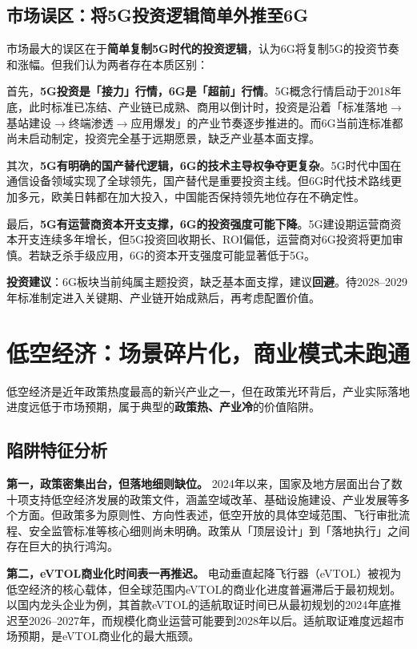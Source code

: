 \subsection{市场误区：将5G投资逻辑简单外推至6G}

市场最大的误区在于\textbf{简单复制5G时代的投资逻辑}，认为6G将复制5G的投资节奏和涨幅。但我们认为两者存在本质区别：

首先，\textbf{5G投资是「接力」行情，6G是「超前」行情}。5G概念行情启动于2018年底，此时标准已冻结、产业链已成熟、商用以倒计时，投资是沿着「标准落地$\to$基站建设$\to$终端渗透$\to$应用爆发」的产业节奏逐步推进的。而6G当前连标准都尚未启动制定，投资完全基于远期愿景，缺乏产业基本面支撑。

其次，\textbf{5G有明确的国产替代逻辑，6G的技术主导权争夺更复杂}。5G时代中国在通信设备领域实现了全球领先，国产替代是重要投资主线。但6G时代技术路线更加多元，欧美日韩都在加大投入，中国能否保持领先地位存在不确定性。

最后，\textbf{5G有运营商资本开支支撑，6G的投资强度可能下降}。5G建设期运营商资本开支连续多年增长，但5G投资回收期长、ROI偏低，运营商对6G投资将更加审慎。若缺乏杀手级应用，6G的资本开支强度可能显著低于5G。

\textbf{投资建议}：6G板块当前纯属主题投资，缺乏基本面支撑，建议\textbf{回避}。待2028--2029年标准制定进入关键期、产业链开始成熟后，再考虑配置价值。

\section{低空经济：场景碎片化，商业模式未跑通}

低空经济是近年政策热度最高的新兴产业之一，但在政策光环背后，产业实际落地进度远低于市场预期，属于典型的\textbf{政策热、产业冷}的价值陷阱。

\subsection{陷阱特征分析}

\textbf{第一，政策密集出台，但落地细则缺位。} 2024年以来，国家及地方层面出台了数十项支持低空经济发展的政策文件，涵盖空域改革、基础设施建设、产业发展等多个方面。但政策多为原则性、方向性表述，低空开放的具体空域范围、飞行审批流程、安全监管标准等核心细则尚未明确。政策从「顶层设计」到「落地执行」之间存在巨大的执行鸿沟。

\textbf{第二，eVTOL商业化时间表一再推迟。} 电动垂直起降飞行器（eVTOL）被视为低空经济的核心载体，但全球范围内eVTOL的商业化进度普遍滞后于最初规划。以国内龙头企业为例，其首款eVTOL的适航取证时间已从最初规划的2024年底推迟至2026--2027年，而规模化商业运营可能要到2028年以后。适航取证难度远超市场预期，是eVTOL商业化的最大瓶颈。

